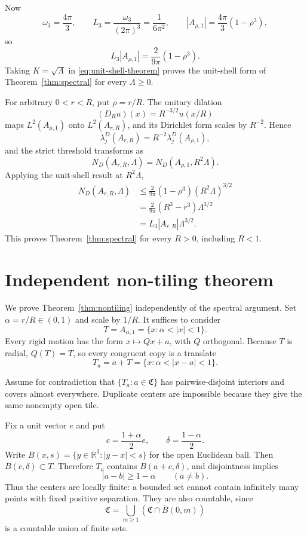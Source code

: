 \documentclass[11pt]{article}
\numberwithin{equation}{section}
\theoremstyle{definition}
\theoremstyle{remark}
\newcommand{\R}{\mathbb R}
\begin{document}
Now
\[
  \omega_3=\frac{4\pi}{3},
  \qquad
  L_3=\frac{\omega_3}{(2\pi)^3}=\frac1{6\pi^2},
  \qquad
  |A_{\rho,1}|=\frac{4\pi}{3}(1-\rho^3),
\]
so
\begin{equation}
  L_3|A_{\rho,1}|=\frac{2}{9\pi}(1-\rho^3).
  \label{eq:weyl-normalization}
\end{equation}
Taking \(K=\sqrt\Lambda\) in \eqref{eq:unit-shell-theorem} proves the
unit-shell form of Theorem~\ref{thm:spectral} for every \(\Lambda\ge0\).

For arbitrary \(0<r<R\), put \(\rho=r/R\).  The unitary dilation
\[
  (D_Ru)(x)=R^{-3/2}u(x/R)
\]
maps \(L^2(A_{\rho,1})\) onto \(L^2(A_{r,R})\), and its Dirichlet form
scales by \(R^{-2}\).  Hence
\[
  \lambda_j^D(A_{r,R})=R^{-2}\lambda_j^D(A_{\rho,1}),
\]
and the strict threshold transforms as
\begin{equation}
  N_D(A_{r,R},\Lambda)
  =N_D(A_{\rho,1},R^2\Lambda).
  \label{eq:dilation-count}
\end{equation}
Applying the unit-shell result at \(R^2\Lambda\),
\[
\begin{aligned}
  N_D(A_{r,R},\Lambda)
  &\le\frac{2}{9\pi}(1-\rho^3)(R^2\Lambda)^{3/2}\\
  &=\frac{2}{9\pi}(R^3-r^3)\Lambda^{3/2}\\
  &=L_3|A_{r,R}|\Lambda^{3/2}.
\end{aligned}
\]
This proves Theorem~\ref{thm:spectral} for every \(R>0\), including
\(R<1\).

\appendix

\section{Independent non-tiling theorem}

We prove Theorem~\ref{thm:nontiling} independently of the spectral argument.
Set \(\alpha=r/R\in(0,1)\) and scale by \(1/R\).  It suffices to consider
\[
  T=A_{\alpha,1}=\{x:\alpha<|x|<1\}.
\]
Every rigid motion has the form \(x\mapsto Qx+a\), with \(Q\) orthogonal.
Because \(T\) is radial, \(Q(T)=T\), so every congruent copy is a translate
\[
  T_a=a+T=\{x:\alpha<|x-a|<1\}.
\]

Assume for contradiction that \(\{T_a:a\in\mathfrak C\}\) has
pairwise-disjoint interiors and covers almost everywhere.  Duplicate centers
are impossible because they give the same nonempty open tile.

Fix a unit vector \(e\) and put
\[
  c=\frac{1+\alpha}{2}e,
  \qquad
  \delta=\frac{1-\alpha}{2}.
\]
Write \(B(x,s)=\{y\in\R^3:|y-x|<s\}\) for the open Euclidean ball.
Then \(B(c,\delta)\subset T\).  Therefore \(T_a\) contains
\(B(a+c,\delta)\), and disjointness implies
\begin{equation}
  |a-b|\ge1-\alpha
  \qquad(a\ne b).
  \label{eq:center-separation}
\end{equation}
Thus the centers are locally finite: a bounded set cannot contain infinitely
many points with fixed positive separation.  They are also countable, since
\[
  \mathfrak C
  =\bigcup_{m\ge1}(\mathfrak C\cap\overline B(0,m))
\]
is a countable union of finite sets.
\end{document}
